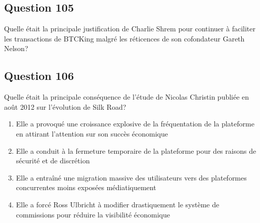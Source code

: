 \documentclass[12pt,a4paper]{article}
\begin{document}
\bigskip


\subsection*{Question 105}
Quelle était la principale justification de Charlie Shrem pour continuer à faciliter les transactions de BTCKing malgré les réticences de son cofondateur Gareth Nelson?


\bigskip


\subsection*{Question 106}
Quelle était la principale conséquence de l'étude de Nicolas Christin publiée en août 2012 sur l'évolution de Silk Road?

\begin{enumerate}[label=\Alph*., leftmargin=*]
\item Elle a provoqué une croissance explosive de la fréquentation de la plateforme en attirant l'attention sur son succès économique
\item Elle a conduit à la fermeture temporaire de la plateforme pour des raisons de sécurité et de discrétion
\item Elle a entraîné une migration massive des utilisateurs vers des plateformes concurrentes moins exposées médiatiquement
\item Elle a forcé Ross Ulbricht à modifier drastiquement le système de commissions pour réduire la visibilité économique
\end{enumerate}

\bigskip
\end{document}
